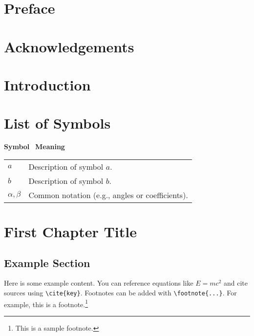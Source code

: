 \documentclass[11pt,oneside]{book} %
\begin{document}
\cleardoublepage
\thispagestyle{empty}
\tableofcontents

\cleardoublepage
\chapter*{Preface}

\cleardoublepage
\chapter*{Acknowledgements}

\cleardoublepage
\chapter*{Introduction}

\cleardoublepage
\chapter*{List of Symbols}
\begin{center}
  \textbf{Symbol} \quad\quad\quad\ \textbf{Meaning}\\[0.2cm]
  \begin{tabular}{ll}
    $a$ & Description of symbol $a$.\\
    $b$ & Description of symbol $b$.\\
    $\alpha,\beta$ & Common notation (e.g., angles or coefficients).\\
  \end{tabular}
\end{center}

\mainmatter

\chapter{First Chapter Title}

\section{Example Section}
Here is some example content. You can reference equations like \(E=mc^2\) and cite sources using \verb|\cite{key}|.  Footnotes can be added with \verb|\footnote{...}|.  For example, this is a footnote.\footnote{This is a sample footnote.}


\backmatter
\printbibliography[heading=bibintoc] %
\end{document}
